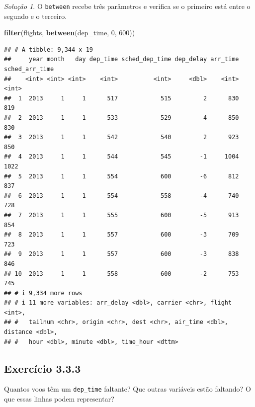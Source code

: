 \documentclass[
]{latex/krantz}
\newenvironment{Shaded}{\begin{snugshade}}{\end{snugshade}}
\newcommand{\DecValTok}[1]{\textcolor[rgb]{0.00,0.00,0.81}{#1}}
\newcommand{\FunctionTok}[1]{\textcolor[rgb]{0.13,0.29,0.53}{\textbf{#1}}}
\newcommand{\NormalTok}[1]{#1}
\theoremstyle{definition}
\theoremstyle{definition}
\theoremstyle{definition}
\theoremstyle{definition}
\theoremstyle{remark}
\newtheorem*{solution}{Solução}
\begin{document}
\begin{solution}

O \texttt{between} recebe três parâmetros e verifica se o primeiro está entre o segundo e o terceiro.

\begin{Shaded}
\begin{Highlighting}[]
\FunctionTok{filter}\NormalTok{(flights, }\FunctionTok{between}\NormalTok{(dep\_time, }\DecValTok{0}\NormalTok{, }\DecValTok{600}\NormalTok{))}
\end{Highlighting}
\end{Shaded}

\begin{verbatim}
## # A tibble: 9,344 x 19
##     year month   day dep_time sched_dep_time dep_delay arr_time sched_arr_time
##    <int> <int> <int>    <int>          <int>     <dbl>    <int>          <int>
##  1  2013     1     1      517            515         2      830            819
##  2  2013     1     1      533            529         4      850            830
##  3  2013     1     1      542            540         2      923            850
##  4  2013     1     1      544            545        -1     1004           1022
##  5  2013     1     1      554            600        -6      812            837
##  6  2013     1     1      554            558        -4      740            728
##  7  2013     1     1      555            600        -5      913            854
##  8  2013     1     1      557            600        -3      709            723
##  9  2013     1     1      557            600        -3      838            846
## 10  2013     1     1      558            600        -2      753            745
## # i 9,334 more rows
## # i 11 more variables: arr_delay <dbl>, carrier <chr>, flight <int>,
## #   tailnum <chr>, origin <chr>, dest <chr>, air_time <dbl>, distance <dbl>,
## #   hour <dbl>, minute <dbl>, time_hour <dttm>
\end{verbatim}

\end{solution}

\hypertarget{exr3-3-3}{%
\subsection*{Exercício 3.3.3}\label{exr3-3-3}}

Quantos voos têm um \texttt{dep\_time} faltante? Que outras variáveis estão faltando? O que essas linhas podem representar?
\end{document}
